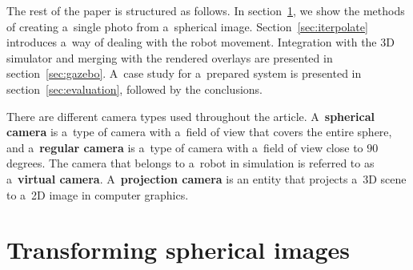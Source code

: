 \documentclass[conference]{ieeetran}
\begin{document}
The rest of the paper is structured as follows. In section~\ref{sec:spherical}, we show the methods of creating
a~single photo from a~spherical image. Section~\ref{sec:iterpolate} introduces a~way of dealing with the robot movement.
Integration with the 3D simulator and merging with the rendered overlays are presented in section~\ref{sec:gazebo}.
A~case study for a~prepared system is presented in section~\ref{sec:evaluation}, followed by the conclusions.






There are different camera types used throughout the article. A~\textbf{spherical camera} is a~type of camera with a~field of view that covers the entire sphere, and a~\textbf{regular camera} is a~type of camera with a~field of view close to $90$ degrees.
The camera that belongs to a~robot in simulation is referred to as a~\textbf{virtual camera}.
A~\textbf{projection camera} is an entity that projects a~3D scene to a~2D image in computer graphics.


\section{Transforming spherical images}
\label{sec:spherical}
\end{document}

